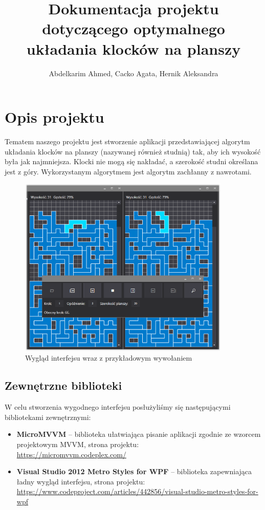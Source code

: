 \documentclass{article}
\title{Dokumentacja projektu dotyczącego optymalnego układania klocków na planszy}
\author{Abdelkarim Ahmed, Cacko Agata, Hernik Aleksandra}
\begin{document}
\maketitle
\tableofcontents
\section{Opis projektu}
Tematem naszego projektu jest stworzenie aplikacji przedstawiającej algorytm układania klocków na planszy (nazywanej również studnią) tak, aby ich wysokość była jak najmniejsza. Klocki nie mogą się nakładać, a szerokość studni określana jest z góry. Wykorzystanym algorytmem jest algorytm zachłanny z nawrotami.



\begin{figure}[H]
\begin{center}
\includegraphics[width=0.9\textwidth]{interfejs.png}
\end{center}
\vspace{-0.3cm}
\caption{Wygląd interfejsu wraz z przykładowym wywołaniem}
\end{figure}



\subsection{Zewnętrzne biblioteki}

W celu stworzenia wygodnego interfejsu posłużyliśmy się następującymi bibliotekami zewnętrznymi:


\begin{itemize}
\item \textbf{MicroMVVM} -- biblioteka ułatwiająca pisanie aplikacji zgodnie ze wzorcem projektowym MVVM, strona projektu: \\ \url{https://micromvvm.codeplex.com/}
\item \textbf{Visual Studio 2012 Metro Styles for WPF} -- biblioteka zapewniająca ładny wygląd interfejsu, strona projektu: \url{https://www.codeproject.com/articles/442856/visual-studio-metro-styles-for-wpf}
\end{itemize}
\end{document}
